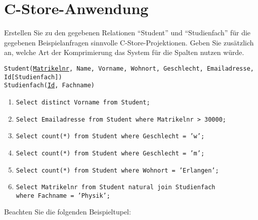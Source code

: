 \section{C-Store-Anwendung}

Erstellen Sie zu den gegebenen Relationen "`Student"' und "`Studienfach"' für die gegebenen Beispielanfragen sinnvolle C-Store-Projektionen.
Geben Sie zusätzlich an, welche Art der Komprimierung das System für die Spalten nutzen würde.

\texttt{Student(\underline{Matrikelnr}, Name, Vorname, Wohnort, Geschlecht, Emailadresse,\\
  Id[Studienfach])}\\
\texttt{Studienfach(\underline{Id}, Fachname)}

\begin{enumerate}
	\item \texttt{Select distinct Vorname from Student;}
	\item \texttt{Select Emailadresse from Student where Matrikelnr > 30000;}
	\item \texttt{Select count(*) from Student where Geschlecht = 'w';}
	\item \texttt{Select count(*) from Student where Geschlecht = 'm';}
	\item \texttt{Select count(*) from Student where Wohnort = 'Erlangen';}
	\item \texttt{Select Matrikelnr from Student natural join Studienfach\\
		where Fachname = 'Physik';}
\end{enumerate}

Beachten Sie die folgenden Beispieltupel:

